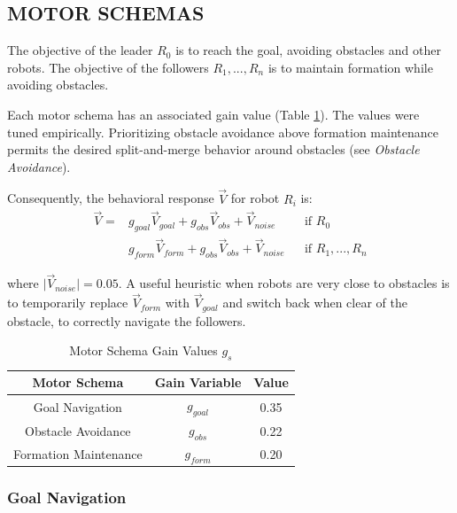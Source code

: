 \documentclass[letterpaper, 10 pt, conference]{ieeeconf}  %
\begin{document}
\subsection{MOTOR SCHEMAS}

The objective of the leader $R_0$ is to reach the goal, avoiding obstacles and other robots. The objective of the followers $R_1,...,R_n$ is to maintain formation while avoiding obstacles.

Each motor schema has an associated gain value (Table \ref{motor_schema_gs}). The values were tuned empirically. Prioritizing obstacle avoidance above formation maintenance permits the desired split-and-merge behavior around obstacles (see \textit{Obstacle Avoidance}).

Consequently, the behavioral response $\vec{V}$ for robot $R_i$ is:
\begin{equation*}
\begin{aligned}
\vec{V} = & g_{goal} \vec{V}_{goal} + g_{obs} \vec{V}_{obs} + \vec{V}_{noise}    && \text{if $R_0$} \\
              & g_{form} \vec{V}_{form} + g_{obs} \vec{V}_{obs} + \vec{V}_{noise}   && \text{if $R_1,...,R_n$}
\end{aligned}
\end{equation*}

where $\lvert\vec{V}_{noise}\rvert = 0.05$. A useful heuristic when robots are very close to obstacles is to temporarily replace $\vec{V}_{form}$ with $\vec{V}_{goal}$ and switch back when clear of the obstacle, to correctly navigate the followers.

\begin{table}[h]
\caption{Motor Schema Gain Values $g_s$}
\label{motor_schema_gs}
\begin{center}
\begin{tabular}{|c|c|c|}
\hline
Motor Schema & Gain Variable & Value \\
\hline
Goal Navigation & $g_{goal}$ & 0.35 \\
Obstacle Avoidance & $g_{obs}$ & 0.22 \\
Formation Maintenance & $g_{form}$ & 0.20 \\
\hline
\end{tabular}
\end{center}
\end{table}

\subsubsection*{Goal Navigation}
\end{document}
